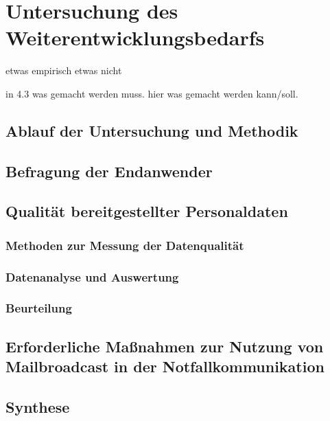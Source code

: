 \section{Untersuchung des Weiterentwicklungsbedarfs}
etwas empirisch etwas nicht

in 4.3 was gemacht werden muss.
hier was gemacht werden kann/soll.

\subsection{Ablauf der Untersuchung und Methodik}

\subsection{Befragung der Endanwender}


\subsection{Qualität bereitgestellter Personaldaten}
\subsubsection{Methoden zur Messung der Datenqualität}
\subsubsection{Datenanalyse und Auswertung}
\subsubsection{Beurteilung}

\subsection{Erforderliche Maßnahmen zur Nutzung von Mailbroadcast in der Notfallkommunikation}
\label{subsec:mbc_notfall}

\subsection{Synthese}